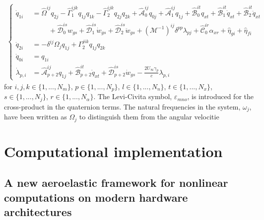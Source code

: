 \documentclass[11pt]{article}
\begin{document}
\begin{equation}
\label{eq3:intrinsic_full_aeroelastic}
\begin{split}
\begin{cases}
              \dot{q}_{1i} &= \hat{\Omega}^{ij} q_{2j}
              - \hat{\Gamma}_{1}^{ijk}q_{1j}q_{1k}
              - \hat{\Gamma}_{2}^{ijk}q_{2j}q_{2k} 
              + \hat{\mathcal{A}}^{ij}_{0}q_{0j}
              + \hat{\mathcal{A}}^{ij}_{1}q_{1j}  
              + \hat{\mathcal{B}}^{it}_{0}q_{xt}
              + \hat{\mathcal{B}}^{it}_{1}\dot{q}_{xt}
              + \hat{\mathcal{B}}^{it}_{2}\ddot{q}_{xt} \\
              & \hspace{1cm}+ \hat{\mathcal{D}}^{is}_{0}w_{gs}
              + \hat{\mathcal{D}}^{is}_{1}\dot{w}_{gs}
              + \hat{\mathcal{D}}^{is}_{2}\ddot{w}_{gs}              
              + \left(\mathcal{M}^{-1}\right)^{ij} \delta^{pp} \lambda_{pj}
              + \hat{\mathcal{C}}_0^{ir}\alpha_{xr} 
              + \hat{\eta}_{gi} + \hat{\eta}_{fi}\\
\dot{q}_{2i} &= -\delta^{ij}\Omega_j q_{1j}+ \Gamma_2^{jik}q_{1j}q_{2k}\\
\dot{q}_{0i} &= q_{1i} \\
 \dot{\lambda}_{p,i} &= \hat{\mathcal{A}}^{ij}_{p+2}q_{1j}
                                      + \hat{\mathcal{B}}^{it}_{p+2}\dot{q}_{xt}
                                      + \hat{\mathcal{D}}^{is}_{p+2}\dot{w}_{gs}
                                      -\frac{2U_\infty\gamma_p }{c}\lambda_{p,i} 
\end{cases}
\end{split}
\end{equation}
%
for $i,j,k \in \{1,...,N_m\}$, $p \in \{1,...,N_p\}$, $l \in \{1,...,N_{n}\}$, $t \in  \{1,...,N_{x}\}$, $s  \in \{1,...,N_{j} \}$, $r \in \{1,...,N_{\alpha}\}$. The Levi-Civita symbol, $\varepsilon_{mno}$, is introduced for the cross-product in the quaternion terms. The natural frequencies in the system, $\omega_j$, have been written as  $\Omega_j$ to distinguish them from the angular velocitie


\section{Computational implementation}
\label{sec:orgc001cf5}
\subsection{A new aeroelastic framework for nonlinear computations on modern hardware architectures}
\label{sec:org8e8e70b}
\end{document}
